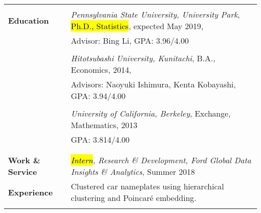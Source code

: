 \documentclass[utf8,letterpaper,oneside]{article}
\begin{document}
\begin{center}
 \begin{tabular}{l l}
  \hline
                           &                                                                                                               \\
  \textbf{Education}       & \textit{Pennsylvania State University, University Park}, \hl{Ph.D., Statistics}, expected May 2019,           \\
                           & Advisor: Bing Li, GPA: 3.96/4.00                                                                              \\
                           &                                                                                                               \\
                           & \textit{Hitotsubashi University, Kunitachi}, B.A., Economics, 2014,                                           \\
                           & Advisors: Naoyuki Ishimura, Kenta Kobayashi, GPA: 3.94/4.00                                                   \\
                           &                                                                                                               \\
                           & \textit{University of California, Berkeley}, Exchange, Mathematics, 2013                                      \\
                           & GPA: 3.814/4.00                                                                                               \\
                           &                                                                                                               \\ \hline
                           &                                                                                                               \\
  \textbf{Work \& Service} & \textit{\hl{Intern}, Research \& Development, Ford Global Data Insights \& Analytics}, Summer 2018            \\
  \textbf{Experience}      & Clustered car nameplates using hierarchical clustering and Poincar\'e embedding.                              \\
                           &                                                                                                               \\

\end{tabular}
\end{center}
\end{document}
